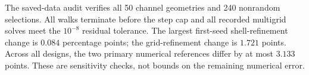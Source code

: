 The saved-data audit verifies all 50 channel geometries and 240 nonrandom selections. All walks terminate before the step cap and all recorded multigrid solves meet the $10^{-8}$ residual tolerance. The largest first-seed shell-refinement change is $0.084$ percentage points; the grid-refinement change is $1.721$ points. Across all designs, the two primary numerical references differ by at most $3.133$ points. These are sensitivity checks, not bounds on the remaining numerical error.
